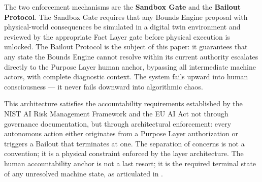 The two enforcement mechanisms are the \textbf{Sandbox Gate} and the \textbf{Bailout Protocol}. The Sandbox Gate requires that any Bounds Engine proposal with physical-world consequences be simulated in a digital twin environment and reviewed by the appropriate Fact Layer gate before physical execution is unlocked. The Bailout Protocol is the subject of this paper: it guarantees that any state the Bounds Engine cannot resolve within its current authority escalates directly to the Purpose Layer human anchor, bypassing all intermediate machine actors, with complete diagnostic context. The system fails upward into human consciousness --- it never fails downward into algorithmic chaos.

This architecture satisfies the accountability requirements established by the NIST AI Risk Management Framework and the EU AI Act not through governance documentation, but through architectural enforcement: every autonomous action either originates from a Purpose Layer authorization or triggers a Bailout that terminates at one. The separation of concerns is not a convention; it is a physical constraint enforced by the layer architecture. The human accountability anchor is not a last resort; it is the required terminal state of any unresolved machine state, as articulated in \cite{wiener1948}.